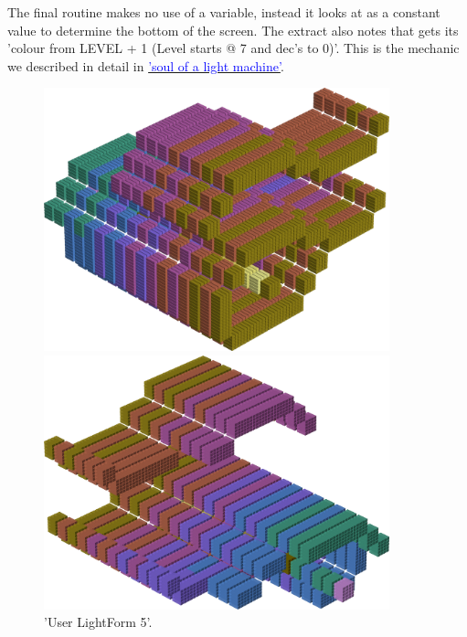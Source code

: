 The final routine makes no use of a  variable, instead it looks at  as a constant value to determine the
bottom of the screen. The extract also notes that  gets its 'colour from LEVEL + 1 (Level starts @ 7 and dec's to 0)'.
This is the mechanic we described in detail in \hyperref[sec:listing_pattern]{\textcolor{blue}{'soul of a light machine'}}.

\clearpage

%
\begin{minipage}[b]{0.48\linewidth}
\begin{figure}[H]
    \centering
    \begin{adjustbox}{width=5cm,margin=0cm 0cm}
      \includegraphics[width=10cm]{src/colorspace_patterns/pattern13-45.png}%
    \end{adjustbox}
    \begin{adjustbox}{width=5cm,margin=0cm 0cm}
      \includegraphics[width=10cm]{src/colorspace_patterns/pattern13-225.png}%
    \end{adjustbox}
\caption{'User LightForm 5'.}
\end{figure}
\end{minipage}
